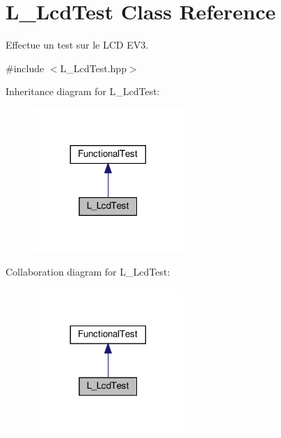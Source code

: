 \hypertarget{classL__LcdTest}{}\section{L\+\_\+\+Lcd\+Test Class Reference}
\label{classL__LcdTest}


Effectue un test sur le L\+CD E\+V3.  




{\ttfamily \#include $<$L\+\_\+\+Lcd\+Test.\+hpp$>$}



Inheritance diagram for L\+\_\+\+Lcd\+Test\+:
\nopagebreak
\begin{figure}[H]
\begin{center}
\leavevmode
\includegraphics[width=161pt]{classL__LcdTest__inherit__graph}
\end{center}
\end{figure}


Collaboration diagram for L\+\_\+\+Lcd\+Test\+:
\nopagebreak
\begin{figure}[H]
\begin{center}
\leavevmode
\includegraphics[width=161pt]{classL__LcdTest__coll__graph}
\end{center}
\end{figure}
